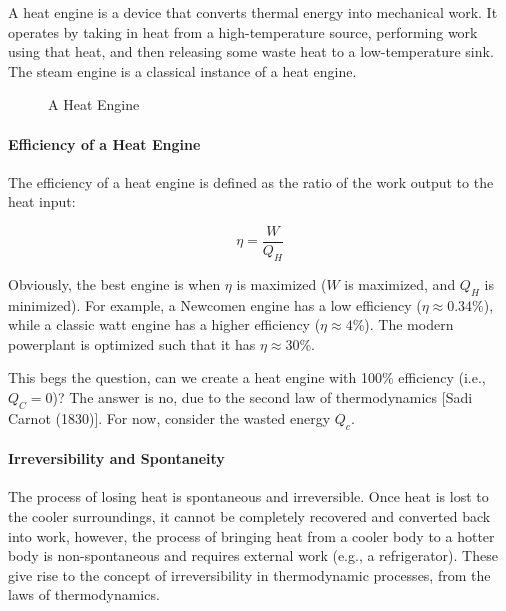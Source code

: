 \documentclass[11pt]{report}
\begin{document}
\begin{definition}
    A heat engine is a device that converts thermal energy into mechanical work. It operates by taking in heat from a high-temperature source, performing work using that heat, and then releasing some waste heat to a low-temperature sink. The steam engine is a classical instance of a heat engine.
\end{definition}
\begin{figure}[h!]
    \centering
    \caption{A Heat Engine}
\end{figure}

\paragraph{Efficiency of a Heat Engine} The efficiency of a heat engine is defined as the ratio of the work output to the heat input:

\begin{equation}
    \eta = \frac{W}{Q_H}
\end{equation}

Obviously, the best engine is when $\eta$ is maximized ($W$ is maximized, and $Q_H$ is minimized). For example, a Newcomen engine has a low efficiency ($\eta \approx 0.34\%$), while a classic watt engine has a higher efficiency ($\eta \approx 4\%$). The modern powerplant is optimized such that it has $\eta \approx 30\%$.

This begs the question, can we create a heat engine with 100\% efficiency (i.e., $Q_C = 0$)? The answer is no, due to the second law of thermodynamics [Sadi Carnot (1830)]. For now, consider the wasted energy $Q_c$. 

\paragraph{Irreversibility and Spontaneity} The process of losing heat is spontaneous and irreversible. Once heat is lost to the cooler surroundings, it cannot be completely recovered and converted back into work, however, the process of bringing heat from a cooler body to a hotter body is non-spontaneous and requires external work (e.g., a refrigerator). These give rise to the concept of irreversibility in thermodynamic processes, from the laws of thermodynamics.
\end{document}
